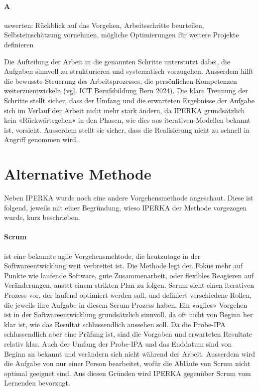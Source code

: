 \paragraph{A} uswerten: Rückblick auf das Vorgehen, Arbeitsschritte beurteilen, Selbsteinschätzung vornehmen, mögliche Optimierungen für weitere Projekte definieren

\pagebreak
Die Aufteilung der Arbeit in die genannten Schritte unterstützt dabei, die Aufgaben sinnvoll zu strukturieren und systematisch vorzugehen. Ausserdem hilft die bewusste Steuerung des Arbeitsprozesses, die persönlichen Kompetenzen weiterzuentwickeln (vgl. ICT Berufsbildung Bern 2024\parencite{ict}). Die klare Trennung der Schritte stellt sicher, dass der Umfang und die erwarteten Ergebnisse der Aufgabe sich im Verlauf der Arbeit nicht mehr stark ändern, da IPERKA grundsätzlich kein «Rückwärtsgehen» in den Phasen, wie dies aus iterativen Modellen bekannt ist, vorsieht. Ausserdem stellt sie sicher, dass die Realisierung nicht zu schnell in Angriff genommen wird.

\section{Alternative Methode}\label{sec:alternative-methode}
Neben IPERKA wurde noch eine andere Vorgehensmethode angeschaut. Diese ist folgend, jeweils mit einer Begründung, wieso IPERKA der Methode vorgezogen wurde, kurz beschrieben.

\paragraph{Scrum} ist eine bekannte agile Vorgehensmehtode, die heutzutage in der Softwareentwicklung weit verbreitet ist. Die Methode legt den Fokus mehr auf Punkte wie laufende Software, gute Zusammenarbeit, oder flexibles Reagieren auf Veränderungen, ansttt einem strikten Plan zu folgen. Scrum sieht einen iterativen Prozess vor, der laufend optimiert werden soll, und definiert verschiedene Rollen, die jeweils ihre Aufgabe in diesem Scrum-Prozess haben. Ein «agiles» Vorgehen ist in der Softwareentwicklung grundsätzlich sinnvoll, da oft nicht von Beginn her klar ist, wie das Resultat schlussendlich aussehen soll. Da die Probe-IPA schlussendlich aber eine Prüfung ist, sind die Vorgaben und erwarteten Resultate relativ klar. Auch der Umfang der Probe-IPA und das Enddatum sind von Beginn an bekannt und verändern sich nicht während der Arbeit. Ausserdem wird die Aufgabe von nur einer Person bearbeitet, wofür die Abläufe von Scrum nicht optimal geeignet sind. Aus diesen Gründen wird IPERKA gegenüber Scrum vom Lernenden bevorzugt.

